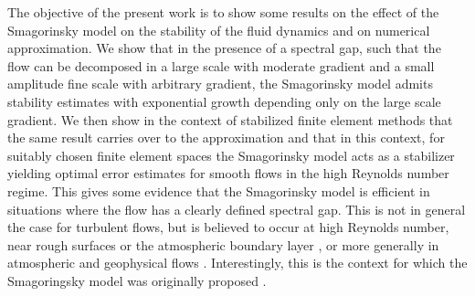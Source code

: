 \documentclass[10pt]{amsart}
\numberwithin{equation}{section}
\theoremstyle{definition}
\theoremstyle{remark}
\renewcommand{\(}{\bigl(}
\renewcommand{\)}{\bigr)}
\begin{document}
The objective of the present work is to show some results on
the effect of the Smagorinsky model on the stability of the fluid
dynamics and on numerical approximation. We show that in the presence of a spectral gap, such that the
flow can be decomposed in a large scale with moderate gradient
and a small amplitude fine scale with arbitrary gradient, the
Smagorinsky model admits stability estimates with exponential growth
depending only on the large scale gradient. We then show in the
context of stabilized finite element methods that the same result
carries over to the approximation and that in this context, for
suitably chosen finite element spaces the Smagorinsky model acts as a
stabilizer
yielding optimal error estimates for smooth flows in the high
Reynolds number regime. This gives some evidence that the Smagorinsky
model is efficient in situations where the flow has a clearly defined
spectral gap. This is not in general the case for turbulent flows, but
is believed to occur at high Reynolds number, near rough surfaces or
the atmospheric boundary layer \cite{GT09}, or more generally in atmospheric and geophysical flows \cite{FP70,We80,PFC83}.
Interestingly, this is the context for which the Smagoringsky model was
originally proposed \cite{Smag}. 
\end{document}
